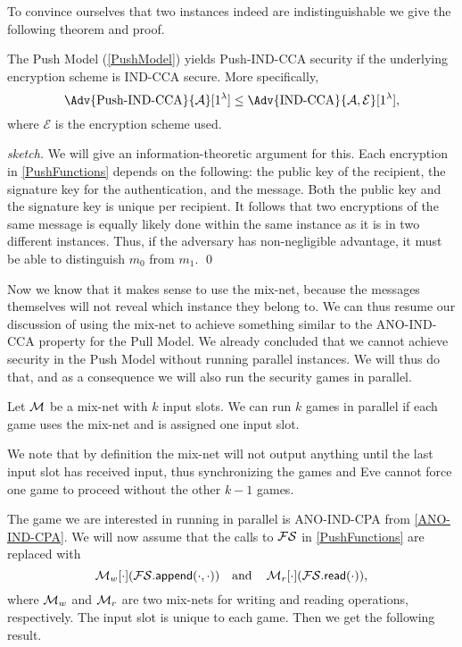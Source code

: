 To convince ourselves that two instances indeed are indistinguishable we give 
the following theorem and proof.

\begin{theorem}
  The Push Model (\cref{PushModel}) yields Push-IND-CCA security if the 
  underlying encryption scheme is IND-CCA secure.
  More specifically,
  \begin{equation*}
    \Adv{\text{Push-IND-CCA}}{\A}[1^\lambda]\leq \Adv{\text{IND-CCA}}{\A, 
      \mathcal{E}}[1^\lambda],
  \end{equation*}
  where \(\mathcal{E}\) is the encryption scheme used.
\end{theorem}

\begin{proof}[sketch]
  We will give an information-theoretic argument for this.
  Each encryption in \cref{PushFunctions} depends on the following:
  the public key of the recipient, the signature key for the authentication, 
  and the message.
  Both the public key and the signature key is unique per recipient.
  It follows that two encryptions of the same message is equally likely done 
  within the same instance as it is in two different instances.
  Thus, if the adversary has non-negligible advantage, it must be able to 
  distinguish \(m_0\) from \(m_1\).
  \qed{}
\end{proof}

Now we know that it makes sense to use the mix-net, because the messages 
themselves will not reveal which instance they belong to.
We can thus resume our discussion of using the mix-net to achieve something 
similar to the ANO-IND-CCA property for the Pull Model.
We already concluded that we cannot achieve security in the Push Model without 
running parallel instances.
We will thus do that, and as a consequence we will also run the security games 
in parallel.

\begin{definition}
  Let \(\operatorname{\mathcal{M}}\) be a mix-net with \(k\) input slots.
  We can run \(k\) games in parallel if each game uses the mix-net and is 
  assigned one input slot.
\end{definition}

We note that by definition the mix-net will not output anything until the last
input slot has received input, thus synchronizing the games and Eve cannot 
force one game to proceed without the other \(k-1\) games.

The game we are interested in running in parallel is ANO-IND-CPA from 
\cref{ANO-IND-CPA}.
We will now assume that the calls to \(\FS\) in \cref{PushFunctions} are 
replaced with \[\M_w[\cdot](\fswrite[\cdot][\cdot]) \quad\text{and}\quad 
  \M_r[\cdot](\fsread[\cdot]),\] where \(\operatorname{\mathcal{M}}_w\) and \(\operatorname{\mathcal{M}}_r\) are two mix-nets 
for writing and reading operations, respectively.
The input slot is unique to each game.
Then we get the following result.

